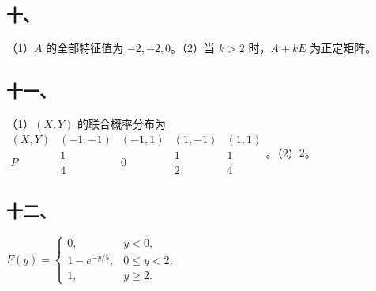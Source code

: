 \documentclass[UTF8,12pt]{ctexart}
\begin{document}
\subsection*{十、}

（1）\(\displaystyle A\) 的全部特征值为 \(\displaystyle -2,\allowbreak -2,\allowbreak 0\)。（2）当 \(\displaystyle k>2\) 时，\(\displaystyle A+kE\) 为正定矩阵。


\subsection*{十一、}

（1）\(\displaystyle (X,\allowbreak Y)\) 的联合概率分布为 \(\displaystyle \begin{array}{c|cccc}(X,\allowbreak Y)&(-1,\allowbreak -1)&(-1,\allowbreak 1)&(1,\allowbreak -1)&(1,\allowbreak 1)\\\hline P&\dfrac{\displaystyle 1}{\displaystyle 4}&0&\dfrac{\displaystyle 1}{\displaystyle 2}&\dfrac{\displaystyle 1}{\displaystyle 4}\end{array}\)。（2）\(\displaystyle 2\)。


\subsection*{十二、}

\(\displaystyle F(y)=\begin{cases}0,\allowbreak &y<0,\allowbreak \\1-e^{-y/5},\allowbreak &0\le y<2,\allowbreak \\1,\allowbreak &y\ge2.\end{cases}\)
\end{document}
